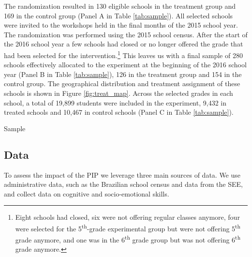 \documentclass[11pt,a4paper]{article}
\begin{document}
The randomization resulted in 130 eligible schools in the treatment group and 169 in the control group (Panel A in Table \ref{tab:sample}). All selected schools were invited to the workshops held in the final months of the 2015 school year. The randomization was performed using the 2015 school census. After the start of the 2016 school year a few schools had closed or no longer offered the grade that had been selected for the intervention.\footnote{Eight schools had closed, six were not offering regular classes anymore, four were selected for the 5\textsuperscript{th}-grade experimental group but were not offering 5\textsuperscript{th} grade anymore, and one was in the 6\textsuperscript{th} grade group but was not offering 6\textsuperscript{th} grade anymore.} This leaves us with a final sample of 280 schools effectively allocated to the experiment at the beginning of the 2016 school year (Panel B in Table \ref{tab:sample}), 126 in the treatment group and 154 in the control group. The geographical distribution and treatment assignment of these schools is shown in Figure \ref{fig:treat_map}. Across the selected grades in each school, a total of 19,899 students were included in the experiment, 9,432 in treated schools and 10,467 in control schools (Panel C in Table \ref{tab:sample}).  

\begin{table}[htbp]
    \caption{Sample}
    \label{tab:sample}
    \centering
    
\end{table}
%

\subsection{Data} \label{sec:data}

To assess the impact of the PIP we leverage three main sources of data. We use administrative data, such as the Brazilian school census and data from the SEE, and collect data on cognitive and socio-emotional skills.
\end{document}
